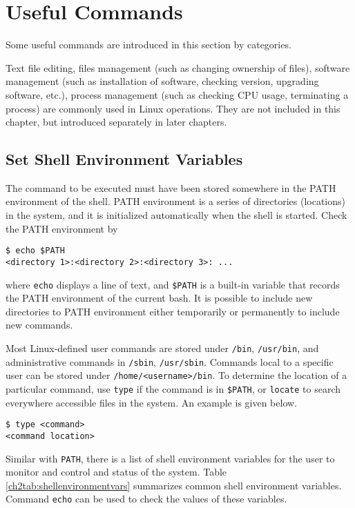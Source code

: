 \section{Useful Commands}

Some useful commands are introduced in this section by categories.

Text file editing, files management (such as changing ownership of files), software management (such as installation of software, checking version, upgrading software, etc.), process management (such as checking CPU usage, terminating a process) are commonly used in Linux operations. They are not included in this chapter, but introduced separately in later chapters.

\subsection{Set Shell Environment Variables}\label{ch2subsec:shellenvvar}

The command to be executed must have been stored somewhere in the PATH environment of the shell. PATH environment is a series of directories (locations) in the system, and it is initialized automatically when the shell is started. Check the PATH environment by
\begin{lstlisting}
$ echo $PATH
<directory 1>:<directory 2>:<directory 3>: ...
\end{lstlisting}
where \verb|echo| displays a line of text, and \verb|$PATH| is a built-in variable that records the PATH environment of the current bash. It is possible to include new directories to PATH environment either temporarily or permanently to include new commands.

Most Linux-defined user commands are stored under \verb|/bin|, \verb|/usr/bin|, and administrative commands in \verb|/sbin|, \verb|/usr/sbin|. Commands local to a specific user can be stored under \verb|/home/<username>/bin|. To determine the location of a particular command, use \verb|type| if the command is in \verb|$PATH|, or \verb|locate| to search everywhere accessible files in the system. An example is given below.
\begin{lstlisting}
$ type <command>
<command location>
\end{lstlisting}

Similar with \verb|PATH|, there is a list of shell environment variables for the user to monitor and control and status of the system. Table \ref{ch2tab:shellenvironmentvars} summarizes common shell environment variables. Command \verb|echo| can be used to check the values of these variables.

